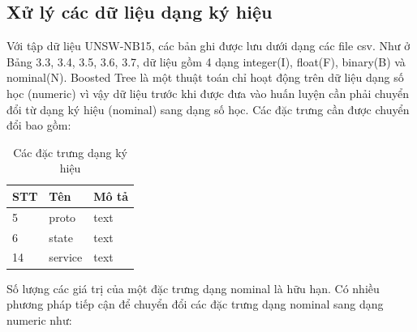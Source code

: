 \subsection{Xử lý các dữ liệu dạng ký hiệu}
Với tập dữ liệu UNSW-NB15, các bản ghi được lưu dưới dạng các file csv. Như ở Bảng 3.3, 3.4, 3.5, 3.6, 3.7, dữ liệu gồm 4 dạng integer(I), float(F), binary(B) và nominal(N). Boosted Tree là một thuật toán chỉ hoạt động trên dữ liệu dạng số học (numeric) vì vậy dữ liệu trước khi được đưa vào huấn luyện cần phải chuyển đổi từ dạng ký hiệu (nominal) sang dạng số học. Các đặc trưng cần được chuyển đổi bao gồm:\\
    \begin{table}[H]
    \centering
		\begin{tabular}{|l|l|l|}
			\hline
        	\textbf{STT} & \textbf{Tên} & \textbf{Mô tả}\\
			\hline
			5 & proto & text \\
			\hline
			6 & state & text \\
			\hline
			14 & service & text \\
			\hline
			\end{tabular}
    \caption{Các đặc trưng dạng ký hiệu}
    \end{table}
Số lượng các giá trị của một đặc trưng dạng nominal là hữu hạn. Có nhiều phương pháp tiếp cận để chuyển đổi các đặc trưng dạng nominal sang dạng numeric như: 
